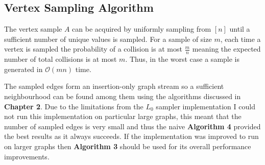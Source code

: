 \documentclass[11pt,twoside,a4paper]{report}
\begin{document}
\subsection{Vertex Sampling Algorithm} %

\par The vertex sample $A$ can be acquired by uniformly sampling from $[n]$ until a sufficient number of unique values is sampled. For a sample of size $m$, each time a vertex is sampled the probability of a collision is at most $\frac{m}n$ meaning the expected number of total collisions is at most $m$. Thus, in the worst case a sample is generated in $\mathcal{O}(mn)$ time.

\par The sampled edges form an insertion-only graph stream so a sufficient neighbourhood can be found among them using the algorithms discussed in \textbf{Chapter 2}. Due to the limitations from the $L_0$ sampler implementation I could not run this implementation on particular large graphs, this meant that the number of sampled edges is very small and thus the naive \textbf{Algorithm 4} provided the best results as it always succeeds. If the implementation was improved to run on larger graphs then \textbf{Algorithm 3} should be used for its overall performance improvements.

\end{document}
